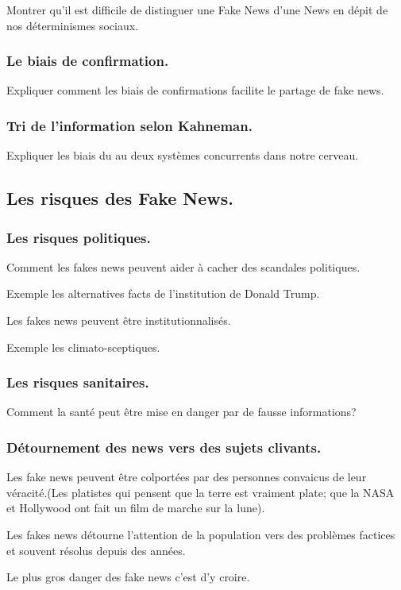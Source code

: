 \documentclass[onecolumn, 12pt]{article}
\begin{document}
    Montrer qu'il est difficile de distinguer une Fake News d'une News en dépit
    de nos déterminismes sociaux.

    \subsubsection{Le biais de confirmation.}
    Expliquer comment les biais de confirmations facilite le partage de fake
    news.

    \subsubsection{Tri de l'information selon Kahneman.}
    Expliquer les biais du au deux systèmes concurrents dans notre cerveau.

  \subsection{Les risques des Fake News.}

    \subsubsection{Les risques politiques.}
    Comment les fakes news peuvent aider à cacher des scandales politiques.

    Exemple les alternatives facts de l'institution de Donald Trump.

    Les fakes news peuvent être institutionnalisés.

    Exemple les climato-sceptiques.
    \subsubsection{Les risques sanitaires.}
    Comment la santé peut être mise en danger par de fausse informations?
    \subsubsection{Détournement des news vers des sujets clivants.}
    Les fake news peuvent être colportées par des personnes convaicus de leur
    véracité.(Les platistes qui pensent que la terre est vraiment plate; que la
    NASA et Hollywood ont fait un film de marche sur la lune).

    Les fakes news détourne l'attention de la population vers des problèmes
    factices et souvent résolus depuis des années.

    Le plus gros danger des fake news c'est d'y croire.
\end{document}
